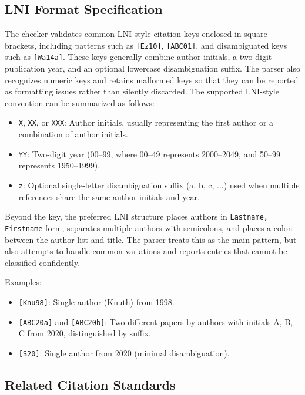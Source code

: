 \documentclass[12pt,a4paper,oneside]{report}
\begin{document}
\subsection{LNI Format Specification}

The checker validates common LNI-style citation keys enclosed in square brackets, including patterns such as \texttt{[Ez10]}, \texttt{[ABC01]}, and disambiguated keys such as \texttt{[Wa14a]}. These keys generally combine author initials, a two-digit publication year, and an optional lowercase disambiguation suffix. The parser also recognizes numeric keys and retains malformed keys so that they can be reported as formatting issues rather than silently discarded. The supported LNI-style convention can be summarized as follows:
\begin{itemize}
    \item \texttt{X}, \texttt{XX}, or \texttt{XXX}: Author initials, usually representing the first author or a combination of author initials.
    \item \texttt{YY}: Two-digit year (00--99, where 00--49 represents 2000--2049, and 50--99 represents 1950--1999).
    \item \texttt{z}: Optional single-letter disambiguation suffix (a, b, c, ...) used when multiple references share the same author initials and year.
\end{itemize}

Beyond the key, the preferred LNI structure places authors in \texttt{Lastname, Firstname} form, separates multiple authors with semicolons, and places a colon between the author list and title. The parser treats this as the main pattern, but also attempts to handle common variations and reports entries that cannot be classified confidently.

Examples:
\begin{itemize}
    \item \texttt{[Knu98]}: Single author (Knuth) from 1998.
    \item \texttt{[ABC20a]} and \texttt{[ABC20b]}: Two different papers by authors with initials A, B, C from 2020, distinguished by suffix.
    \item \texttt{[S20]}: Single author from 2020 (minimal disambiguation).
\end{itemize}

\subsection{Related Citation Standards}
\end{document}
